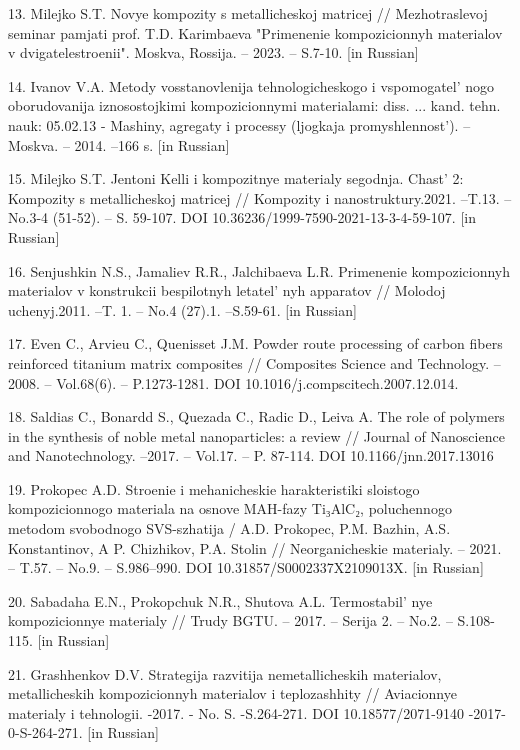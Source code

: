 13. Milejko S.T. Novye kompozity s metallicheskoj matricej //
Mezhotraslevoj seminar pamjati prof. T.D. Karimbaeva "Primenenie
kompozicionnyh materialov v dvigatelestroenii". Moskva, Rossija. --
2023. -- S.7-10. {[}in Russian{]}

14. Ivanov V.A. Metody vosstanovlenija tehnologicheskogo i
vspomogatel' nogo oborudovanija iznosostojkimi
kompozicionnymi materialami: diss. ... kand. tehn. nauk: 05.02.13 -
Mashiny, agregaty i processy (ljogkaja
promyshlennost'). -- Moskva. -- 2014. --166 s. {[}in
Russian{]}

15. Milejko S.T. Jentoni Kelli i kompozitnye materialy segodnja.
Chast'{} 2: Kompozity s metallicheskoj matricej //
Kompozity i nanostruktury.2021. --T.13. -- No.3-4 (51-52). -- S.
59-107. DOI 10.36236/1999-7590-2021-13-3-4-59-107. {[}in Russian{]}

16. Senjushkin N.S., Jamaliev R.R., Jalchibaeva L.R. Primenenie
kompozicionnyh materialov v konstrukcii bespilotnyh
letatel' nyh apparatov // Molodoj uchenyj.2011. --T.
1. -- No.4 (27).1. --S.59-61. {[}in Russian{]}

17. Even C., Arvieu C., Quenisset J.M. Powder route processing of carbon
fibers reinforced titanium matrix composites // Composites Science and
Technology. -- 2008. -- Vol.68(6). -- P.1273-1281. DOI
10.1016/j.compscitech.2007.12.014.

18. Saldias C., Bonardd S., Quezada C., Radic D., Leiva A. The role of
polymers in the synthesis of noble metal nanoparticles: a review //
Journal of Nanoscience and Nanotechnology. --2017. -- Vol.17. -- P.
87-114. DOI 10.1166/jnn.2017.13016

19. Prokopec A.D. Stroenie i mehanicheskie harakteristiki sloistogo
kompozicionnogo materiala na osnove MAH-fazy Ti₃AlC₂, poluchennogo
metodom svobodnogo SVS-szhatija / A.D. Prokopec, P.M. Bazhin, A.S.
Konstantinov, A P. Chizhikov, P.A. Stolin // Neorganicheskie
materialy. -- 2021. -- T.57. -- No.9. -- S.986--990. DOI
10.31857/S0002337X2109013X. {[}in Russian{]}

20. Sabadaha E.N., Prokopchuk N.R., Shutova A.L.
Termostabil' nye kompozicionnye materialy // Trudy
BGTU. -- 2017. -- Serija 2. -- No.2. -- S.108-115. {[}in Russian{]}

21. Grashhenkov D.V. Strategija razvitija nemetallicheskih materialov,
metallicheskih kompozicionnyh materialov i teplozashhity //
Aviacionnye materialy i tehnologii. -2017. - No. S. -S.264-271. DOI
10.18577/2071-9140 -2017-0-S-264-271. {[}in Russian{]}

